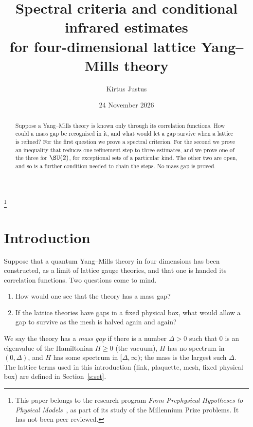 
\usepackage{tikz}
\usetikzlibrary{positioning,arrows.meta}
\title[Spectral criteria and conditional infrared estimates]{Spectral criteria and conditional infrared estimates\\ for four-dimensional lattice Yang--Mills theory}
\author{Kirtus Justus}
\address{Theoretical Physicist, Port Coquitlam, British Columbia, Canada}
\date{24 November 2026}
\thanks{This paper belongs to the research program \emph{From Prephysical Hypotheses to Physical
Models}~\cite{Prog}, as part of its study of the Millennium Prize problems. It has not been peer reviewed.}

\begin{abstract}
Suppose a Yang--Mills theory is known only through its correlation functions. How could a mass gap be
recognised in it, and what would let a gap survive when a lattice is refined? For the first question we prove
a spectral criterion. For the second we prove an inequality that reduces one refinement step to three
estimates, and we prove one of the three for $\SU(2)$, for exceptional sets of a particular kind. The other two are open, and so is a further condition
needed to chain the steps. No mass gap is proved.
\end{abstract}
\maketitle
\tableofcontents

\section{Introduction}\label{s:intro}

Suppose that a quantum Yang--Mills theory in four dimensions has been constructed, as a limit of lattice
gauge theories, and that one is handed its correlation functions. Two questions come to mind.
\begin{enumerate}
\item How would one see that the theory has a mass gap?
\item If the lattice theories have gaps in a fixed physical box, what would allow a gap to survive as the
mesh is halved again and again?
\end{enumerate}
We say the theory has a \emph{mass gap} if there is a number $\Delta>0$ such that $0$ is an eigenvalue of the
Hamiltonian $H\ge0$ (the vacuum), $H$ has no spectrum in $(0,\Delta)$, and $H$ has some spectrum in
$[\Delta,\infty)$; the mass is the largest such $\Delta$. The lattice terms used in this introduction (link, plaquette,
mesh, fixed physical box) are defined in Section~\ref{s:set}.

